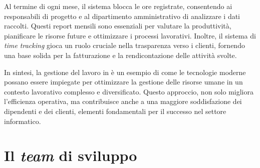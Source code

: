 \noindent Al termine di ogni mese, il sistema blocca le ore registrate, consentendo ai responsabili di progetto e al dipartimento amministrativo 
di analizzare i dati raccolti. Questi report mensili sono essenziali per valutare la produttività, pianificare le risorse future e ottimizzare 
i processi lavorativi. Inoltre, il sistema di \textit{time tracking} gioca un ruolo cruciale nella trasparenza verso i clienti, 
fornendo una base solida per la fatturazione e la rendicontazione delle attività svolte.

\noindent In sintesi, la gestione del lavoro in \azienda{} è un esempio di come le tecnologie moderne possano essere impiegate per 
ottimizzare la gestione delle risorse umane in un contesto lavorativo complesso e diversificato. Questo approccio, non solo migliora 
l'efficienza operativa, ma contribuisce anche a una maggiore soddisfazione dei dipendenti e dei clienti, elementi fondamentali per il 
successo nel settore informatico.


\section{Il \textit{team} di sviluppo}

